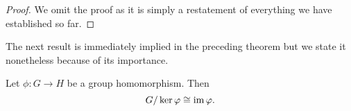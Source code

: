 \begin{proof}
    We omit the proof as it is simply a restatement of everything we have established so far.
\end{proof}

The next result is immediately implied in the preceding theorem but we state it nonetheless because of its importance.

\begin{theorem}
    Let \(\phi: G \to H\) be a group homomorphism. Then
    \[
        G/\ker \varphi \cong \operatorname{im} \varphi.
    \]
\end{theorem}

